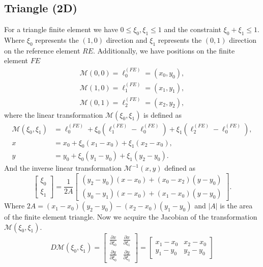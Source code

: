 \documentclass[12pt]{ociamthesis}
\begin{document}
\subsection{Triangle (2D)}
For a triangle finite element we have $0 \leq \xi_0, \xi_1 \leq 1$ and the constraint $\xi_0+\xi_1 \leq 1$. Where $\xi_0$ represents the $(1,0)$ direction and $\xi_1$ represents the $(0,1)$ direction on the reference element $RE$. Additionally, we have positions on the finite element $FE$
\begin{align}
\mathcal{M}(0,0) = \ell_0^{(FE)} = (x_0, y_0), \\
\mathcal{M}(1,0) = \ell_1^{(FE)} = (x_1, y_1), \\
\mathcal{M}(0,1) = \ell_2^{(FE)} = (x_2, y_2),
\end{align}
where the linear transformation $\mathcal{M}(\xi_0,\xi_1)$ is defined as 
\begin{align}
    \mathcal{M}(\xi_0,\xi_1) &= \ell_0^{(FE)} + \xi_0(\ell_1^{(FE)}-\ell_0^{(FE)})+ \xi_1(\ell_2^{(FE)}-\ell_0^{(FE)}),\\
    x &= x_0 + \xi_0(x_1-x_0)+\xi_1(x_2-x_0), \\
    y &= y_0 + \xi_0(y_1-y_0)+\xi_1(y_2-y_0).
\end{align}
And the inverse linear transformation $\mathcal{M}^{-1}(x,y)$ defined as
\begin{equation} \label{Map_In_Tri}
\left [
\begin{matrix}
\xi_0 \\
\xi_1
\end{matrix}
\right ] =
\frac{1}{2A}
\left [
\begin{matrix}
(y_2-y_0)(x-x_0)+(x_0-x_2)(y-y_0)\\
(y_0-y_1)(x-x_0)+(x_1-x_0)(y-y_0)
\end{matrix}
\right ].
\end{equation}
Where $2A=(x_1-x_0)(y_2-y_0)-(x_2-x_0)(y_1-y_0)$ and $|A|$ is the area of the finite element triangle. Now we acquire the Jacobian of the transformation $\mathcal{M}(\xi_0, \xi_1)$.
\begin{equation}
D\mathcal{M}(\xi_0, \xi_1) = 
\left [
\begin{matrix}
\frac{\partial x}{\partial \xi_0} & \frac{\partial x}{\partial \xi_1} \\
\frac{\partial y}{\partial \xi_0} & \frac{\partial y}{\partial \xi_1}
\end{matrix}
\right ] = 
\left [
\begin{matrix}
x_1-x_0 & x_2-x_0 \\
y_1-y_0 & y_2-y_0
\end{matrix}
\right ]
\end{equation}
\end{document}
